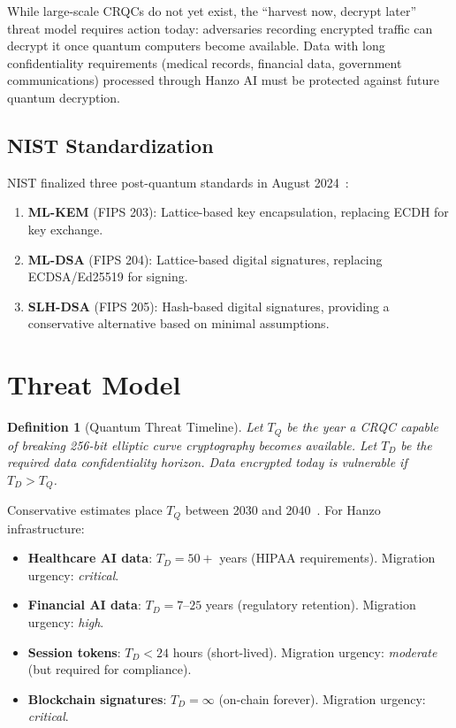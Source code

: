 \documentclass[11pt]{article}
\newtheorem{definition}{Definition}
\begin{document}
While large-scale CRQCs do not yet exist, the ``harvest now, decrypt later''
threat model requires action today: adversaries recording encrypted traffic can
decrypt it once quantum computers become available. Data with long
confidentiality requirements (medical records, financial data, government
communications) processed through Hanzo AI must be protected against future
quantum decryption.

\subsection{NIST Standardization}

NIST finalized three post-quantum standards in August 2024~\cite{nistpq}:
\begin{enumerate}[leftmargin=1.4em]
    \item \textbf{ML-KEM} (FIPS 203): Lattice-based key encapsulation,
    replacing ECDH for key exchange.
    \item \textbf{ML-DSA} (FIPS 204): Lattice-based digital signatures,
    replacing ECDSA/Ed25519 for signing.
    \item \textbf{SLH-DSA} (FIPS 205): Hash-based digital signatures,
    providing a conservative alternative based on minimal assumptions.
\end{enumerate}

\section{Threat Model}
\label{sec:threat}

\begin{definition}[Quantum Threat Timeline]
Let $T_Q$ be the year a CRQC capable of breaking 256-bit elliptic curve
cryptography becomes available. Let $T_D$ be the required data confidentiality
horizon. Data encrypted today is vulnerable if $T_D > T_Q$.
\end{definition}

Conservative estimates place $T_Q$ between 2030 and
2040~\cite{quantumtimeline}. For Hanzo infrastructure:
\begin{itemize}[leftmargin=1.1em]
    \item \textbf{Healthcare AI data}: $T_D = 50+$ years (HIPAA requirements).
    Migration urgency: \emph{critical}.
    \item \textbf{Financial AI data}: $T_D = 7$--$25$ years (regulatory
    retention). Migration urgency: \emph{high}.
    \item \textbf{Session tokens}: $T_D < 24$ hours (short-lived). Migration
    urgency: \emph{moderate} (but required for compliance).
    \item \textbf{Blockchain signatures}: $T_D = \infty$ (on-chain forever).
    Migration urgency: \emph{critical}.
\end{itemize}
\end{document}
